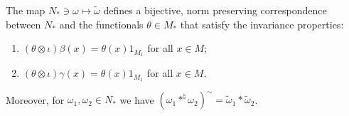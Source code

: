\begin{prop}\label{PropInvariance}
 The map $N_\ast \ni \omega \mapsto \tilde{\omega}$ defines a bijective, norm preserving correspondence between $N_\ast$ and the   functionals $\theta \in M_\ast$ that satisfy the invariance properties:
\begin{enumerate}\itemsep=0pt
 \item\label{LemInvarianceI} $(\theta \otimes \iota) \beta(x) = \theta(x) 1_{M_1}$ for all $x \in M$;
\item\label{LemInvarianceII} $(\theta \otimes \iota) \gamma(x) = \theta(x) 1_{M_1}$ for all $x \in M$.
\end{enumerate}
Moreover, for $\omega_1, \omega_2 \in N_\ast$ we have $ \left( \omega_1 \ast^\natural \omega_2 \right)^\sim = \tilde{\omega}_1 \ast \tilde{\omega}_2$.
\end{prop}
